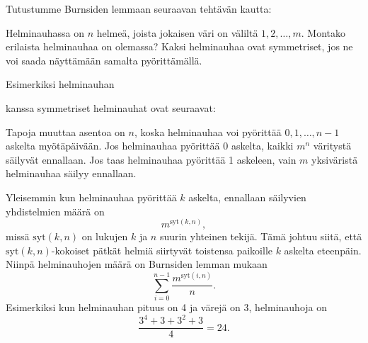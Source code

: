 Tutustumme Burnsiden lemmaan seuraavan tehtävän kautta:

\begin{task}
Helminauhassa on $n$ helmeä,
joista jokaisen väri on väliltä $1,2,\ldots,m$.
Montako erilaista helminauhaa on olemassa?
Kaksi helminauhaa ovat symmetriset,
jos ne voi saada näyttämään samalta pyörittämällä.
\end{task}

\noindent
Esimerkiksi helminauhan
\begin{center}
\end{center}
kanssa symmetriset helminauhat ovat seuraavat:
\begin{center}
\end{center}
Tapoja muuttaa asentoa on $n$,
koska helminauhaa voi pyörittää $0,1,\ldots,n-1$
askelta myötäpäivään.
Jos helminauhaa pyörittää 0 askelta,
kaikki $m^n$ väritystä säilyvät ennallaan.
Jos taas helminauhaa pyörittää 1 askeleen,
vain $m$ yksiväristä helminauhaa säilyy ennallaan.

Yleisemmin kun helminauhaa pyörittää $k$ askelta,
ennallaan säilyvien yhdistelmien määrä on
\[m^{\textrm{syt}(k,n)},\]
missä $\textrm{syt}(k,n)$ on lukujen $k$ ja $n$
suurin yhteinen tekijä.
Tämä johtuu siitä, että $\textrm{syt}(k,n)$-kokoiset
pätkät helmiä siirtyvät toistensa paikoille
$k$ askelta eteenpäin.
Niinpä helminauhojen määrä on
Burnsiden lemman mukaan
\[\sum_{i=0}^{n-1} \frac{m^{\textrm{syt}(i,n)}}{n}. \]
Esimerkiksi kun helminauhan pituus on 4
ja värejä on 3, helminauhoja on
\[\frac{3^4+3+3^2+3}{4} = 24. \]

